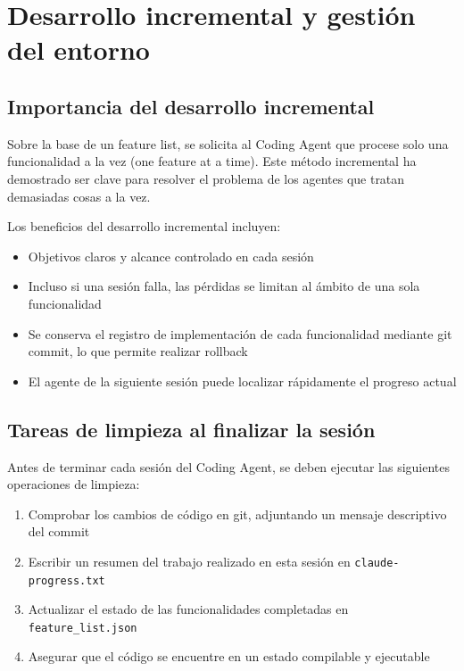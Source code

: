 \section{Desarrollo incremental y gestión del entorno}

\subsection{Importancia del desarrollo incremental}

Sobre la base de un feature list, se solicita al Coding Agent que procese solo una funcionalidad a la vez (one feature at a time). Este método incremental ha demostrado ser clave para resolver el problema de los agentes que tratan demasiadas cosas a la vez.

Los beneficios del desarrollo incremental incluyen:
\begin{itemize}
    \item Objetivos claros y alcance controlado en cada sesión
    \item Incluso si una sesión falla, las pérdidas se limitan al ámbito de una sola funcionalidad
    \item Se conserva el registro de implementación de cada funcionalidad mediante git commit, lo que permite realizar rollback
    \item El agente de la siguiente sesión puede localizar rápidamente el progreso actual
\end{itemize}

\subsection{Tareas de limpieza al finalizar la sesión}

Antes de terminar cada sesión del Coding Agent, se deben ejecutar las siguientes operaciones de limpieza:

\begin{enumerate}
    \item Comprobar los cambios de código en git, adjuntando un mensaje descriptivo del commit
    \item Escribir un resumen del trabajo realizado en esta sesión en \texttt{claude-progress.txt}
    \item Actualizar el estado de las funcionalidades completadas en \texttt{feature\_list.json}
    \item Asegurar que el código se encuentre en un estado compilable y ejecutable
\end{enumerate}

